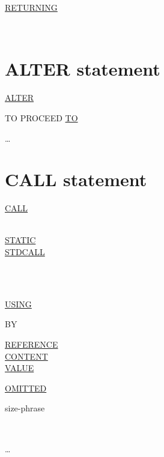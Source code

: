 \documentclass[a4paper,oneside,svgnames]{scrbook}
\makeatletter
\newcommand{\key}[1]{\underline{#1}}
\newcommand{\deleted}[1]{%
  \colorbox{red!75}{#1}}
\newcommand{\gnucobol}[1]{%
  \colorbox{orange!75}{#1}}
\newcommand{\miscext}[1]{%
  \colorbox{blue!50}{#1}}
\newenvironment{0-1}{$\left[ \begin{tabular}{@{}l@{}}}{\end{tabular} \right]$}
\newenvironment{1=}{$\left\{ \begin{tabular}{@{}l@{}}}{\end{tabular} \right\}$}
\makeatother
\begin{document}
\begin{0-1}
  \key{RETURNING} \identifier
\end{0-1} \\

\section{ALTER statement}

\deleted{
  \key{ALTER}
  \begin{1=}
    \procedurename TO PROCEED \key{TO} \procedurename
  \end{1=} \ldots
}

\section{CALL statement}

\key{CALL}
\miscext{
  \begin{0-1}
    \mnemonicname \\
    \key{STATIC} \\
    \key{STDCALL}
  \end{0-1}
}
\begin{1=}
  \identifier \\
  \literal \\
  \functionname
\end{1=}


\begin{0-1}
  \key{USING}
  \begin{1=}
    \begin{0-1}
      BY
      \begin{1=}
        \key{REFERENCE} \\
        \key{CONTENT} \\
        \key{VALUE}
      \end{1=}
    \end{0-1}
    \begin{1=}
      \key{OMITTED} \\

      \gnucobol{
        \begin{0-1}
          size-phrase
        \end{0-1}
      }
      \begin{1=}
        \identifier \\
        \literal
      \end{1=}
    \end{1=}
  \end{1=}\ldots
\end{0-1}
\end{document}
